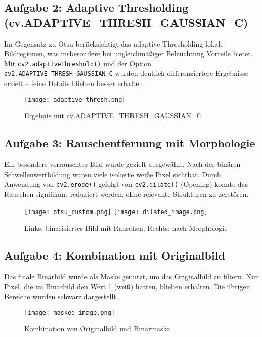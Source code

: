\documentclass[a4paper, fontsize=10pt, DIV=9, parskip=half, headings=small]{scrartcl}
\begin{document}
\subsection{Aufgabe 2: Adaptive Thresholding (cv.ADAPTIVE\_THRESH\_GAUSSIAN\_C)}

Im Gegensatz zu Otsu berücksichtigt das adaptive Thresholding lokale Bildregionen, was insbesondere bei ungleichmäßiger Beleuchtung Vorteile bietet. Mit
\texttt{cv2.adaptiveThreshold()} und der Option \texttt{cv2.ADAPTIVE\_THRESH\_GAUSSIAN\_C} wurden deutlich differenziertere Ergebnisse erzielt – feine Details blieben besser erhalten.

\begin{figure}[H]
  \centering
  \texttt{[image: adaptive\_thresh.png]}
  \caption{Ergebnis mit cv.ADAPTIVE\_THRESH\_GAUSSIAN\_C}
\end{figure}

\subsection{Aufgabe 3: Rauschentfernung mit Morphologie}

Ein besonders verrauschtes Bild wurde gezielt ausgewählt. Nach der binären Schwellenwertbildung waren viele isolierte weiße Pixel sichtbar. Durch Anwendung von
\texttt{cv2.erode()} gefolgt von \texttt{cv2.dilate()} (Opening) konnte das Rauschen signifikant reduziert werden, ohne relevante Strukturen zu zerstören.

\begin{figure}[H]
  \centering
  \texttt{[image: otsu\_custom.png]}
  \texttt{[image: dilated\_image.png]}
  \caption{Links: binarisiertes Bild mit Rauschen, Rechts: nach Morphologie}
\end{figure}

\subsection{Aufgabe 4: Kombination mit Originalbild}

Das finale Binärbild wurde als Maske genutzt, um das Originalbild zu filtern. Nur Pixel, die im Binärbild den Wert 1 (weiß) hatten, blieben erhalten. Die übrigen Bereiche wurden schwarz dargestellt.

\begin{figure}[H]
  \centering
  \texttt{[image: masked\_image.png]}
  \caption{Kombination von Originalbild und Binärmaske}
\end{figure}
\end{document}
